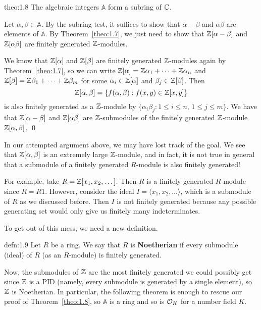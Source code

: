 \begin{theo}{theo:1.8}
    The algebraic integers $\mathbb{A}$ form a subring of $\mathbb{C}$.
\end{theo}\vspace{-0.25cm}
\begin{pf}
    Let $\alpha, \beta \in \mathbb{A}$. By the subring test, it suffices to show that 
    $\alpha - \beta$ and $\alpha\beta$ are elements of $\mathbb{A}$. By 
    Theorem~\ref{theo:1.7}, we just need to show that $\mathbb{Z}[\alpha - \beta]$ 
    and $\mathbb{Z}[\alpha\beta]$ are finitely generated $\mathbb{Z}$-modules. 

    We know that $\mathbb{Z}[\alpha]$ and $\mathbb{Z}[\beta]$ are finitely generated 
    $\mathbb{Z}$-modules again by Theorem~\ref{theo:1.7}, so 
    we can write $\mathbb{Z}[\alpha] = \mathbb{Z}\alpha_1 + \cdots + \mathbb{Z}\alpha_n$ and 
    $\mathbb{Z}[\beta] = \mathbb{Z}\beta_1 + \cdots + \mathbb{Z}\beta_m$ for some 
    $\alpha_i \in \mathbb{Z}[\alpha]$ and $\beta_j \in \mathbb{Z}[\beta]$. Then 
    \[ \mathbb{Z}[\alpha, \beta] = \{f(\alpha, \beta) : f(x, y) \in \mathbb{Z}[x, y]\} \] 
    is also finitely generated as a $\mathbb{Z}$-module by 
    $\{\alpha_i \beta_j : 1 \leq i \leq n,\, 1 \leq j \leq m\}$. We have 
    that $\mathbb{Z}[\alpha-\beta]$ and $\mathbb{Z}[\alpha\beta]$ are $\mathbb{Z}$-submodules of 
    the finitely generated $\mathbb{Z}$-module $\mathbb{Z}[\alpha, \beta]$. \qed
\end{pf}\vspace{-0.25cm}

In our attempted argument above, we may have lost track of the goal. 
We see that $\mathbb{Z}[\alpha, \beta]$ is an extremely large $\mathbb{Z}$-module, and in 
fact, it is not true in general that a submodule of a finitely generated 
$R$-module is also finitely generated!

For example, take $R = \mathbb{Z}[x_1, x_2, \dots]$. Then $R$ is a finitely generated 
$R$-module since $R = R1$. However, consider the ideal $I = 
\langle x_1, x_2, \dots \rangle$, which is a submodule of $R$ as we 
discussed before. Then $I$ is not finitely generated because any 
possible generating set would only give us finitely many indeterminates. 

To get out of this mess, we need a new definition. 

\begin{defn}{defn:1.9}
    Let $R$ be a ring. We say that $R$ is {\bf Noetherian} if every 
    submodule (ideal) of $R$ (as an $R$-module) is finitely generated. 
\end{defn}\vspace{-0.25cm}

Now, the submodules of $\mathbb{Z}$ are the most finitely generated we could 
possibly get since $\mathbb{Z}$ is a PID (namely, every submodule is 
generated by a single element), so $\mathbb{Z}$ is Noetherian. In particular, the 
following theorem is enough to rescue our proof of Theorem~\ref{theo:1.8},
so $\mathbb{A}$ is a ring and so is ${\cal O}_K$ for a number field $K$. 

